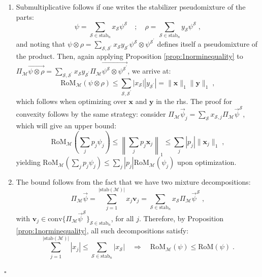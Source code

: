 \documentclass[10pt,aps,pra,twocolumn,floatfix,nofootinbib,superscriptaddress,longbibliography]{revtex4-2}
\newcommand{\1}{\mathbbm{1}}
\begin{document}
\begin{enumerate}
    \begin{equation}
        \mathrm{RoM}_\mathcal M(\mathcal E(\psi)) \leq \sum_{\mathcal S, \mathcal S^\prime \in \mathrm{stab}_n} |x_\mathcal S| p^\mathcal S_{\mathcal S^\prime} =\|\mathbf x\|_1\;,
    \end{equation}
    which, upon minimizing over $\mathbf x$, arrive at $\mathrm{RoM}_\mathcal M (\mathcal E(\psi)) \leq \mathrm{RoM}_\mathcal M(\psi)$.
    \item Submultiplicative follows if one writes the stabilizer pseudomixture of the parts:
    \begin{equation}
        \psi  =\sum_{\mathcal S \in \mathrm{stab}_n}x_\mathcal S \psi^\mathcal S \quad ; \quad \rho = \sum_{\mathcal S \in \mathrm{stab}_n}y_\mathcal S \psi^\mathcal S\;,
     \end{equation}
     and noting that $\psi \otimes \rho = \sum_{\mathcal S, \mathcal S^\prime }x_\mathcal S y_{\mathcal S^\prime} \psi^\mathcal S \otimes \psi^{\mathcal S^\prime}$ defines itself a pseudomixture of the product. Then, again applying Proposition \ref{prop:1norminequality} to $\Pi_\mathcal M\vec{\psi\otimes \rho} = \sum_{\mathcal S, \mathcal S^\prime} x_\mathcal S y_{\mathcal S^\prime}\Pi_\mathcal M\vec{\psi^\mathcal S \otimes \psi^{\mathcal S^\prime}}$, we arrive at:
     \begin{equation}
         \mathrm{RoM}_\mathcal M(\psi \otimes \rho) \leq \sum_{\mathcal S, \mathcal S^\prime}|x_\mathcal S||y_{\mathcal S^\prime}| =\|\mathbf x\|_1 \|\mathbf y\|_1\;,
     \end{equation}
     which follows when optimizing over $\mathbf x$ and $\mathbf y$ in the rhs. The proof for convexity follows by the same strategy: consider $\Pi_\mathcal M \vec{\psi}_j=\sum_\mathcal S x_{\mathcal S, j} \Pi_\mathcal M \vec{\psi}^\mathcal S$, which will give an upper bound:
     \begin{equation}
         \mathrm{RoM}_\mathcal M\left( \sum_j p_j \psi_j\right) \leq \left\|\sum_j p_j \mathbf x_j\right\|_1 \leq \sum_j |p_j | \|\mathbf x_j\|_1\;,
     \end{equation}
     yielding $\mathrm{RoM}_\mathcal M(\sum_j p_j \psi_j) \leq \sum_j |p_j| \mathrm{RoM}_\mathcal M(\psi_j)$ upon optimization.
     \item The bound follows from the fact that we have two mixture decompositions:
     \begin{equation}
         \Pi_\mathcal M \vec{\psi}  = \sum_{j=1}^{|\mathrm{stab}(\mathcal M)|} x_j \mathbf v_j =\sum_{\mathcal S \in \mathrm{stab}_n } x_\mathcal S \Pi_\mathcal M \vec{\psi}^\mathcal S\;,
     \end{equation}
     with $\mathbf v_j \in \mathrm{conv}\{\Pi_\mathcal M \vec{\psi}^\mathcal S\}_{\mathcal S \in \mathrm{stab}_n}$, for all $j$. Therefore, by Proposition \ref{prop:1norminequality}, all such decompositions satisfy:
     \begin{equation}
        \sum_{j=1}^{|\mathrm{stab}(\mathcal M)|}|x_j| \leq \sum_{\mathcal S \in \mathrm{stab}_n}|x_\mathcal S| \quad \Rightarrow \quad \mathrm{RoM}_\mathcal M(\psi) \leq \mathrm{RoM}(\psi)\;.
     \end{equation}
\end{enumerate}
$\square$
\end{document}
